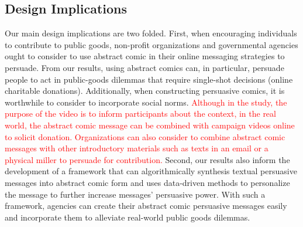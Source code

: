 \subsection{Design Implications}
Our main design implications are two folded. First, when encouraging individuals to contribute to public goods, non-profit organizations and governmental agencies ought to consider to use abstract comic in their online messaging strategies to persuade. From our results, using abstract comics can, in particular, persuade people to act in public-goods dilemmas that require single-shot decisions (online charitable donations). Additionally, when constructing persuasive comics, it is worthwhile to consider to incorporate social norms. \textcolor{red}{Although in the study, the purpose of the video is to inform participants about the context, in the real world, the abstract comic message can be combined with campaign videos online to solicit donation.  Organizations can also consider to combine abstract comic messages with other introductory materials such as texts in an email or a physical miller to persuade for contribution.}  
Second, our results also inform the development of a framework that can algorithmically synthesis textual persuasive messages into abstract comic form and uses data-driven methods to personalize the message to further increase messages' persuasive power. With such a framework, agencies can create their abstract comic persuasive messages easily and incorporate them to alleviate real-world public goods dilemmas. 

